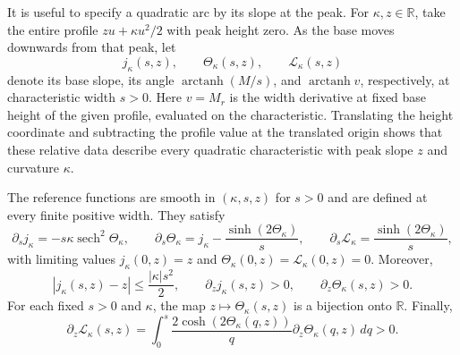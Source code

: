 It is useful to specify a quadratic arc by its slope at the peak.
For \(\kappa,z\in\mathbb R\), take the entire profile
\(zu+\kappa u^2/2\) with peak height zero.  As the base moves downwards
from that peak, let
\[
 j_\kappa(s,z),\qquad \Theta_\kappa(s,z),\qquad
 \mathcal L_\kappa(s,z)
\]
denote its base slope, its angle \(\operatorname{arctanh}(M/s)\), and
\(\operatorname{arctanh}v\), respectively, at characteristic width
\(s>0\).  Here \(v=M_r\) is the width derivative at fixed base height
of the given profile, evaluated on the characteristic.  Translating the
height coordinate and subtracting
the profile value at the translated origin shows that these relative
data describe every quadratic characteristic with peak slope \(z\)
and curvature \(\kappa\).

\begin{lemma}\label{fit:references}
The reference functions are smooth in \((\kappa,s,z)\) for \(s>0\) and
are defined at every finite positive width.  They satisfy
\begin{equation}\label{eq:fit-reference-system}
 \partial_s j_\kappa=-s\kappa\operatorname{sech}^2\Theta_\kappa,
 \qquad
 \partial_s\Theta_\kappa
   =j_\kappa-\frac{\sinh(2\Theta_\kappa)}s,
 \qquad
 \partial_s\mathcal L_\kappa
   =\frac{\sinh(2\Theta_\kappa)}s,
\end{equation}
with limiting values \(j_\kappa(0,z)=z\) and
\(\Theta_\kappa(0,z)=\mathcal L_\kappa(0,z)=0\).  Moreover,
\begin{equation}\label{eq:fit-reference-bounds}
 |j_\kappa(s,z)-z|\le\frac{|\kappa|s^2}{2},\qquad
 \partial_z j_\kappa(s,z)>0,\qquad
 \partial_z\Theta_\kappa(s,z)>0.
\end{equation}
For each fixed \(s>0\) and \(\kappa\), the map
\(z\mapsto\Theta_\kappa(s,z)\) is a bijection onto \(\mathbb R\).
Finally,
\begin{equation}\label{eq:fit-L-z}
 \partial_z\mathcal L_\kappa(s,z)
  =\int_0^s
    \frac{2\cosh(2\Theta_\kappa(q,z))}{q}
       \partial_z\Theta_\kappa(q,z)\,dq>0.
\end{equation}
\end{lemma}

